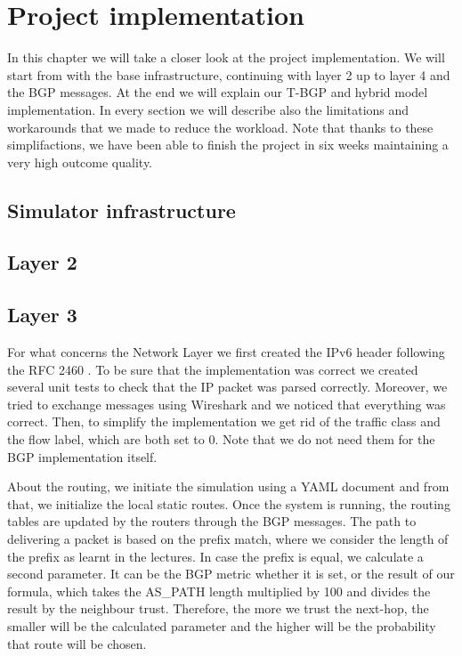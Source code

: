 \chapter{Project implementation}
In this chapter we will take a closer look at the project implementation.
We will start from with the base infrastructure, continuing with layer 2 up to layer 4 and the BGP messages.
At the end we will explain our T-BGP and hybrid model implementation.\newline
In every section we will describe also the limitations and workarounds that we made to reduce the workload.
Note that thanks to these simplifactions, we have been able to finish the project in six weeks maintaining a very high outcome quality.

\section{Simulator infrastructure}

\section{Layer 2}\label{layer2}


\section{Layer 3}\label{layer3}
For what concerns the Network Layer we first created the IPv6 header following the RFC 2460 \cite{rfc2460}.\newline
To be sure that the implementation was correct we created several unit tests to check that the IP packet was parsed correctly.
Moreover, we tried to exchange messages using Wireshark and we noticed that everything was correct.\newline
Then, to simplify the implementation we get rid of the traffic class and the flow label, which are both set to 0.
Note that we do not need them for the BGP implementation itself.
\par About the routing, we initiate the simulation using a YAML document and from that, we initialize the local static routes.\newline
Once the system is running, the routing tables are updated by the routers through the BGP messages.
The path to delivering a packet is based on the prefix match, where we consider the length of the prefix as learnt in the lectures.\newline
In case the prefix is equal, we calculate a second parameter.
It can be the BGP metric whether it is set, or the result of our formula, which takes the AS\_PATH length multiplied by 100 and divides the result by the neighbour trust.
Therefore, the more we trust the next-hop, the smaller will be the calculated parameter and the higher will be the probability that route will be chosen.

